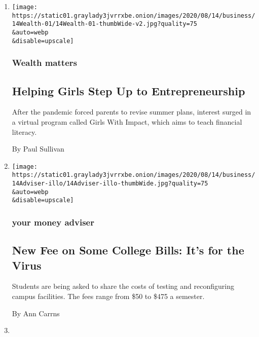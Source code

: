 \begin{enumerate}
\def\labelenumi{\arabic{enumi}.}
\item
  \href{/2020/08/14/your-money/girls-entrepreneurship-financial-literacy.html}{}

  \texttt{[image: https://static01.graylady3jvrrxbe.onion/images/2020/08/14/business/14Wealth-01/14Wealth-01-thumbWide-v2.jpg?quality=75\\\&auto=webp\\\&disable=upscale]}

  \hypertarget{wealth-matters}{%
  \subsubsection{Wealth matters}\label{wealth-matters}}

  \hypertarget{helping-girls-step-up-to-entrepreneurship}{%
  \subsection{Helping Girls Step Up to
  Entrepreneurship}\label{helping-girls-step-up-to-entrepreneurship}}

  After the pandemic forced parents to revise summer plans, interest
  surged in a virtual program called Girls With Impact, which aims to
  teach financial literacy.

  By Paul Sullivan
\item
  \href{/2020/08/14/your-money/colleges-fees-coronavirus.html}{}

  \texttt{[image: https://static01.graylady3jvrrxbe.onion/images/2020/08/14/business/14Adviser-illo/14Adviser-illo-thumbWide.jpg?quality=75\\\&auto=webp\\\&disable=upscale]}

  \hypertarget{your-money-adviser}{%
  \subsubsection{your money adviser}\label{your-money-adviser}}

  \hypertarget{new-fee-on-some-college-bills-its-for-the-virus}{%
  \subsection{New Fee on Some College Bills: It's for the
  Virus}\label{new-fee-on-some-college-bills-its-for-the-virus}}

  Students are being asked to share the costs of testing and
  reconfiguring campus facilities. The fees range from \$50 to \$475 a
  semester.

  By Ann Carrns
\item
  \href{/2020/08/14/business/retirement-inequality-racism.html}{}


\end{enumerate}
